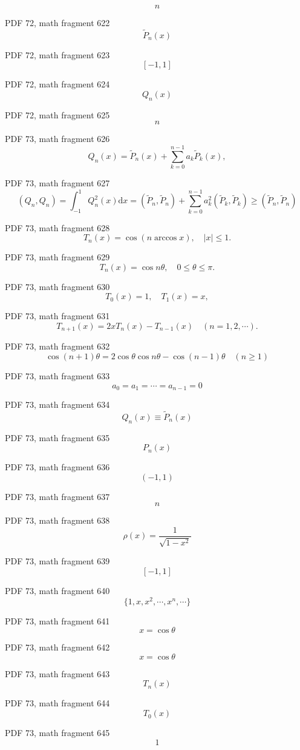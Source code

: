 \documentclass[UTF8,fontset=fandol]{ctexart}
\begin{document}
\[n\]
\par
PDF 72, math fragment 622
\[\widetilde{P}_n(x)\]
\par
PDF 72, math fragment 623
\[[-1,1]\]
\par
PDF 72, math fragment 624
\[Q_n(x)\]
\par
PDF 72, math fragment 625
\[n\]
\par
PDF 73, math fragment 626
\[
Q_n(x) = \tilde{P}_n(x) + \sum_{k=0}^{n-1} a_k \tilde{P}_k(x) ,
\]
\par
PDF 73, math fragment 627
\[
(Q_n, Q_n) = \int_{-1}^{1} Q_n^2(x) \mathrm{d}x = (\tilde{P}_n, \tilde{P}_n) + \sum_{k=0}^{n-1} a_k^2 (\tilde{P}_k, \tilde{P}_k) \geqslant (\tilde{P}_n, \tilde{P}_n)
\]
\par
PDF 73, math fragment 628
\[
T_n(x) = \cos(n \arccos x), \quad |x| \leqslant 1. \tag{3.4.6}
\]
\par
PDF 73, math fragment 629
\[
T_n(x) = \cos n \theta, \quad 0 \leqslant \theta \leqslant \pi.
\]
\par
PDF 73, math fragment 630
\[
T_0(x) = 1, \quad T_1(x) = x,
\]
\par
PDF 73, math fragment 631
\[
T_{n+1}(x) = 2xT_n(x) - T_{n-1}(x) \quad (n = 1, 2, \cdots). \tag{3.4.7}
\]
\par
PDF 73, math fragment 632
\[
\cos(n+1)\theta = 2\cos \theta \cos n \theta - \cos(n-1)\theta \quad (n \geqslant 1)
\]
\par
PDF 73, math fragment 633
\[a_0 = a_1 = \cdots = a_{n-1} = 0\]
\par
PDF 73, math fragment 634
\[Q_n(x) \equiv \tilde{P}_n(x)\]
\par
PDF 73, math fragment 635
\[P_n(x)\]
\par
PDF 73, math fragment 636
\[(-1, 1)\]
\par
PDF 73, math fragment 637
\[n\]
\par
PDF 73, math fragment 638
\[\rho(x) = \frac{1}{\sqrt{1-x^2}}\]
\par
PDF 73, math fragment 639
\[[-1, 1]\]
\par
PDF 73, math fragment 640
\[\{1, x, x^2, \cdots, x^n, \cdots\}\]
\par
PDF 73, math fragment 641
\[x = \cos \theta\]
\par
PDF 73, math fragment 642
\[x = \cos \theta\]
\par
PDF 73, math fragment 643
\[T_n(x)\]
\par
PDF 73, math fragment 644
\[T_0(x)\]
\par
PDF 73, math fragment 645
\[1\]
\end{document}
